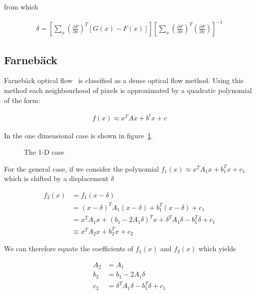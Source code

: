 from which

\begin{align*}
  \delta = \left[\sum_{x}\left(\frac{\partial F}{\partial x}\right)^T\left[G(x) - F(x)\right]\right]\left[\sum_{x}\left(\frac{\partial F}{\partial x}\right)^T\left(\frac{\partial F}{\partial x}\right)\right]^{-1}
\end{align*}

\subsection{Farnebäck}

Farnebäck optical flow~\citep{farneback} is classified as a dense optical flow method. Using this method each neighbourhood of pixels is approximated by a quadratic polynomial of the form:

\begin{align*}
f(x) \approx x^TAx+b^tx+c
\end{align*}

In the one dimensional case is shown in figure~\ref{fig:farneback}.

\begin{figure}[h]
  \centering
  \caption{The 1-D case}
  \label{fig:farneback}
\end{figure}

For the general case, if we consider the polynomial $f_1(x) \approx x^TA_1x+b_1^Tx+c_1$ which is shifted by a displacement $\delta$

\begin{align*}
f_2(x) &= f_1(x-\delta) \\
&= (x-\delta)^T A_1 (x-\delta) + b_1^T (x-\delta) + c_1 \\
&= x^TA_1x + (b_1 - 2A_1\delta)^Tx + \delta^TA_1\delta -b_1^T\delta + c_1 \\
&\equiv x^TA_2x + b_2^Tx + c_2
\end{align*}

We can therefore equate the coefficients of $f_1(x)$ and $f_2(x)$ which yields

\begin{align*}
A_2 &= A_1 \\
b_2 &= b_1 - 2A_1\delta \\
c_2 &= \delta^TA_1\delta - b_1^T\delta + c_1
\end{align*}

